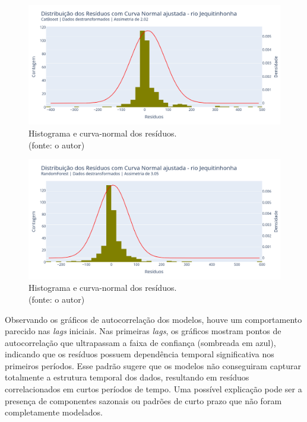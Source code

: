 \begin{figure}[!h]
\centering
\includegraphics[scale=0.33]{Figuras/jequiti/wfv/CB/CB_WFV_LOG_RESID_x_CURVA_NORMAL.png}
\caption{Histograma e curva-normal dos resíduos.\\(fonte: o autor)}
\label{fig:jequiti_CB_WFV_LOG_RESID_x_CURVA_NORMAL}
\end{figure}

\begin{figure}[!h]
\centering
\includegraphics[scale=0.33]{Figuras/jequiti/wfv/RF/RF_WFV_LOG_RESID_x_CURVA_NORMAL.png}
\caption{Histograma e curva-normal dos resíduos.\\(fonte: o autor)}
\label{fig:jequiti_RF_WFV_LOG_RESID_x_CURVA_NORMAL}
\end{figure}
\clearpage

Observando os gráficos de autocorrelação dos modelos, houve um comportamento parecido nas \textit{lags} iniciais. Nas primeiras \textit{lags}, os gráficos mostram pontos de autocorrelação que ultrapassam a faixa de confiança (sombreada em azul), indicando que os resíduos possuem dependência temporal significativa nos primeiros períodos. Esse padrão sugere que os modelos não conseguiram capturar totalmente a estrutura temporal dos dados, resultando em resíduos correlacionados em curtos períodos de tempo. Uma possível explicação pode ser a presença de componentes sazonais ou padrões de curto prazo que não foram completamente modelados.


